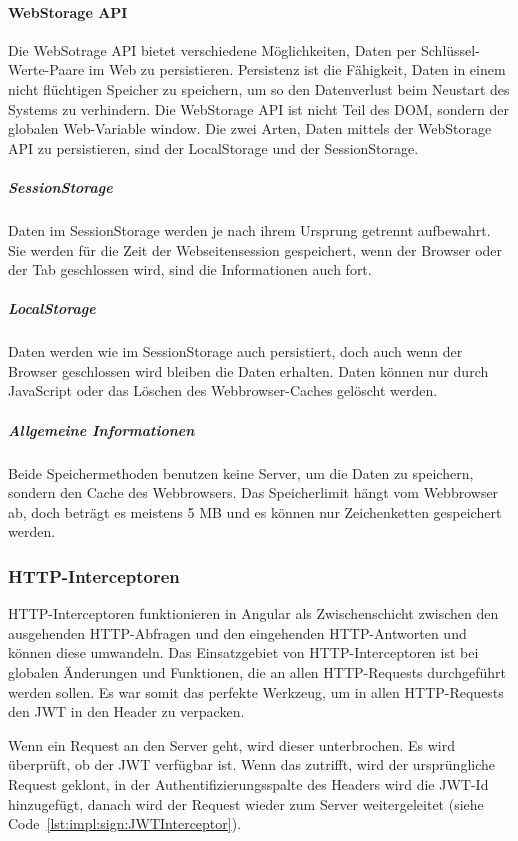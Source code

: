 \paragraph{WebStorage API}
\label{par:impl:usermanagment:WebStorage}
Die WebSotrage API bietet verschiedene Möglichkeiten, Daten per Schlüssel-Werte-Paare im Web zu persistieren. Persistenz ist die Fähigkeit, Daten in einem nicht flüchtigen Speicher zu speichern, um so den Datenverlust beim Neustart des Systems zu verhindern. Die WebStorage API ist nicht Teil des DOM, sondern der globalen Web-Variable window. Die zwei Arten, Daten mittels der WebStorage API zu persistieren, sind der LocalStorage und der SessionStorage.
\cite{WikiPersistenzDefinition} \cite{WebStorageAPI}


\subparagraph{SessionStorage}
Daten im SessionStorage werden je nach ihrem Ursprung getrennt aufbewahrt. Sie werden für die Zeit der Webseitensession gespeichert, wenn der Browser oder der Tab geschlossen wird, sind die Informationen auch fort.
\cite{WebStorageAPI}

\subparagraph{LocalStorage}
Daten werden wie im SessionStorage auch persistiert, doch auch wenn der Browser geschlossen wird bleiben die Daten erhalten. Daten können nur durch JavaScript oder das Löschen des Webbrowser-Caches gelöscht werden.
\cite{WebStorageAPI}

\subparagraph{Allgemeine Informationen}
Beide Speichermethoden benutzen keine Server, um die Daten zu speichern, sondern den Cache des Webbrowsers. Das Speicherlimit hängt vom Webbrowser ab, doch beträgt es meistens 5 MB und es können nur Zeichenketten gespeichert werden.
\cite{WebStorageAPI}

\subsubsection{HTTP-Interceptoren}
HTTP-Interceptoren funktionieren in Angular als Zwischenschicht zwischen den ausgehenden HTTP-Abfragen und den eingehenden HTTP-Antworten und können diese umwandeln.
Das Einsatzgebiet von HTTP-Interceptoren ist bei globalen Änderungen und Funktionen, die an allen HTTP-Requests durchgeführt werden sollen. Es war somit das perfekte Werkzeug, um in allen HTTP-Requests den JWT in den Header zu verpacken.
\cite[10.3 Interceptoren: HTTP-Requests abfangen und transformieren]{AngularBuch}

Wenn ein Request an den Server geht, wird dieser unterbrochen. Es wird überprüft, ob der JWT verfügbar ist. Wenn das zutrifft, wird der ursprüngliche Request geklont, in der Authentifizierungsspalte des Headers wird die JWT-Id hinzugefügt, danach wird der Request wieder zum Server weitergeleitet (siehe Code \ref{lst:impl:sign:JWTInterceptor}). 

